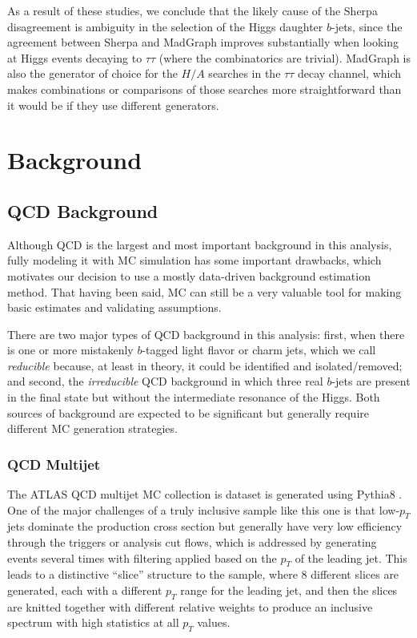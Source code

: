 As a result of these studies, we conclude that the likely cause of the Sherpa 
disagreement is ambiguity in the selection of the Higgs daughter $b$-jets, since
the agreement between Sherpa and MadGraph improves substantially when looking
at Higgs events decaying to $\tau\tau$ (where the combinatorics are trivial).
MadGraph is also the generator of choice for the $H/A$ searches in the $\tau\tau$ 
decay channel, which makes combinations or comparisons of those searches
more straightforward than it would be if they use different generators.

\section{Background}
\subsection{QCD Background}
Although QCD is the largest and most important background in this analysis, fully modeling 
it with MC simulation has some important drawbacks, which motivates our decision to use a 
mostly data-driven background estimation method.  That having been said, MC can 
still be a very valuable tool for making basic estimates and validating assumptions. 

There are two major types of QCD background in this analysis: first, when 
there is one or more mistakenly $b$-tagged light flavor or charm jets, 
which we call \textit{reducible} because, at least in theory, 
it could be identified and isolated/removed; and second, the \textit{irreducible} 
QCD background in which three real $b$-jets are present in the final 
state but without the intermediate resonance of the Higgs.  Both sources of background are 
expected to be significant but generally require different MC generation strategies.



\subsubsection{QCD Multijet}
The ATLAS QCD multijet MC collection is dataset is generated using Pythia8 \cite{Pythia8}.  
One of the major challenges of a truly inclusive sample like this one is that 
low-$p_T$ jets dominate the production cross section but generally have 
very low efficiency through the triggers or analysis cut flows, which is addressed by 
generating events several times with filtering applied based on the $p_T$ 
of the leading jet.  This leads to a distinctive ``slice'' structure to 
the sample, where 8 different slices are generated, each with a different $p_T$ 
range for the leading jet, and then the slices are knitted together with different 
relative weights to produce an inclusive spectrum with high statistics at all $p_T$ values.  

